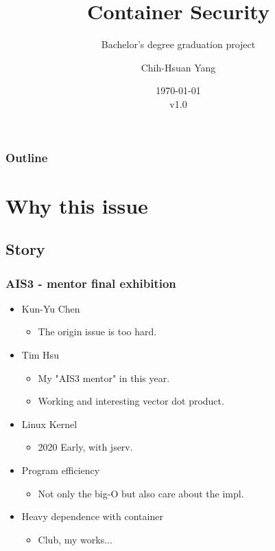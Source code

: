 \documentclass{beamer}
\title{Container Security}
\subtitle{Bachelor's degree graduation project}
\author{Chih-Hsuan Yang}
\institute{National Sun Yat-sen University}
\date{\today\\v1.0}
\begin{document}
\begin{frame}
    \titlepage
\end{frame}

\begin{frame}
    \frametitle{Outline}
    \tableofcontents
\end{frame}

\section{Why this issue}
\subsection{Story}
\begin{frame}
    \frametitle{AIS3 - mentor final exhibition}

    \begin{itemize}
        \item Kun-Yu Chen
              \begin{itemize}
                  \item The origin issue is too hard.
              \end{itemize}
        \item Tim Hsu
              \begin{itemize}
                  \item My "AIS3 mentor" in this year.
                  \item Working and interesting vector dot product.
              \end{itemize}
        \item Linux Kernel
              \begin{itemize}
                  \item 2020 Early, with jserv.
              \end{itemize}
        \item Program efficiency
              \begin{itemize}
                  \item Not only the big-O but also care about the impl.
              \end{itemize}
        \item Heavy dependence with container
              \begin{itemize}
                  \item Club, my works...
              \end{itemize}
    \end{itemize}

\end{frame}
\end{document}
